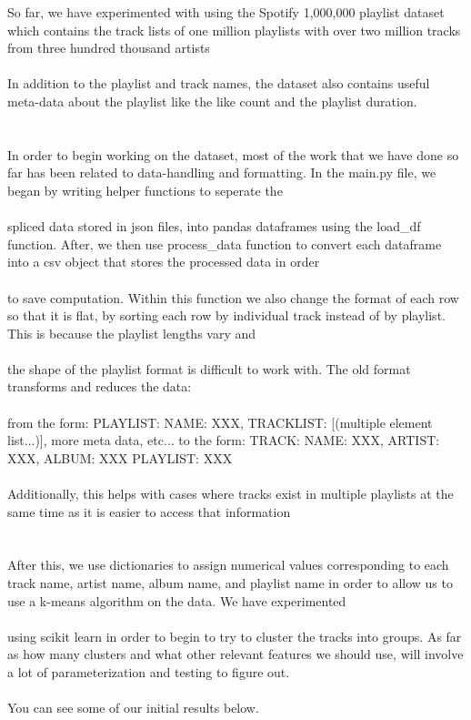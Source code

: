 \documentclass{article}
\begin{document}
So far, we have experimented with using the Spotify 1,000,000 playlist dataset which contains the track lists of one million playlists with over two million tracks from three hundred thousand artists \\ \\
In addition to the playlist and track names, the dataset also contains useful meta-data about the playlist like the like count and the playlist duration. \\ \\ \\

In order to begin working on the dataset, most of the work that we have done so far has been related to data-handling and formatting. In the main.py file, we began by writing helper functions to seperate the \\ \\
spliced data stored in json files, into pandas dataframes using the load_df function. After, we then use process_data function to convert each dataframe into a csv object that stores the processed data in order \\ \\
to save computation. Within this function we also change the format of each row so that it is flat, by sorting each row by individual track instead of by playlist. This is because the playlist lengths vary and \\ \\
the shape of the playlist format is difficult to work with. The old format transforms and reduces the data: \\ \\
from the form: { PLAYLIST: {NAME: XXX, TRACKLIST: [(multiple element list...)], more meta data, etc...}}  to the form: { TRACK: {NAME: XXX, ARTIST: XXX, ALBUM: XXX PLAYLIST: XXX} } \\ \\ 
Additionally, this helps with cases where tracks exist in multiple playlists at the same time as it is easier to access that information \\ \\ \\

After this, we use dictionaries to assign numerical values corresponding to each track name, artist name, album name, and playlist name in order to allow us to use a k-means algorithm on the data. We have experimented \\ \\
using scikit learn in order to begin to try to cluster the tracks into groups. As far as how many clusters and what other relevant features we should use, will involve a lot of parameterization and testing to figure out. \\ \\
You can see some of our initial results below. \\ \\ \\
\end{document}
